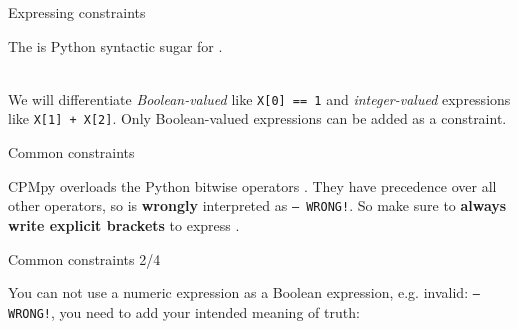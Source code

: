 \documentclass{cons-beamer}
\begin{document}
\begin{flashcardcpmpy}
\begin{frame}{Expressing constraints}
  

  The  is Python syntactic sugar for .

  $ $\\
  We will differentiate \emph{Boolean-valued}  like \lstinline[language=cpmpy]{X[0] == 1} and \textit{integer-valued} expressions like \lstinline[language=cpmpy]{X[1] + X[2]}. Only Boolean-valued expressions can be added as a constraint.

\end{frame}

\begin{frame}{Common constraints}
  \begin{example}
    \vspace{-0.5em}
    
    \vspace{-0.5em}
  \end{example}
  CPMpy overloads the Python bitwise operators \cpminline{&, |, ~}. They have precedence over all other operators, so  is \textbf{wrongly} interpreted as  \texttt{-- WRONG!}. So make sure to \textbf{always write explicit brackets} to express .
  \begin{example}
    \vspace{-0.5em}
    
    \vspace{-0.5em}
  \end{example}
\end{frame}

\begin{frame}{Common constraints 2/4}
  \begin{example}
    \vspace{-0.5em}
    
    \vspace{-0.5em}
  \end{example}
  You can not use a numeric expression as a Boolean expression, e.g. invalid:  \texttt{-- WRONG!}, you need to add your intended meaning of truth: 
\end{frame}


\end{flashcardcpmpy}
\end{document}
